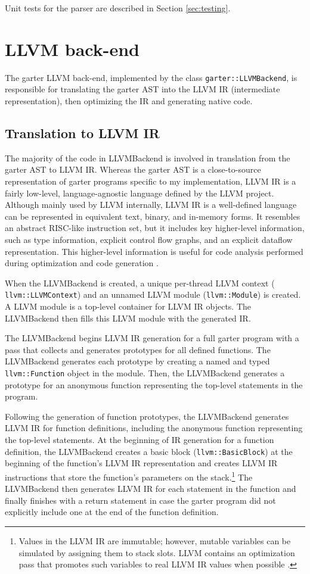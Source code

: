 \documentclass[11pt]{article}
\begin{document}
Unit tests for the parser are described in Section \ref{sec:testing}.

\section{LLVM back-end}

The garter LLVM back-end, implemented by the class {\tt garter::LLVMBackend}, is
responsible for translating the garter AST into the LLVM IR (intermediate
representation), then optimizing the IR and generating native code.

\subsection{Translation to LLVM IR}

The majority of the code in LLVMBackend is involved in translation from the
garter AST to LLVM IR.  Whereas the garter AST is a close-to-source
representation of garter programs specific to my implementation, LLVM IR is a
fairly low-level, language-agnostic language defined by the LLVM project.
Although mainly used by LLVM internally, LLVM IR is a well-defined language can
be represented in equivalent text, binary, and in-memory forms.  It resembles an
abstract RISC-like instruction set, but it includes key higher-level
information, such as type information, explicit control flow graphs, and an
explicit dataflow representation.  This higher-level information is useful for
code analysis performed during optimization and code generation
\cite{lattner2004llvm}.

When the LLVMBackend is created, a unique per-thread LLVM context ({\tt
llvm::LLVMContext}) and an unnamed LLVM module ({\tt llvm::Module}) is created.
A LLVM module is a top-level container for LLVM IR objects.  The LLVMBackend
then fills this LLVM module with the generated IR.

The LLVMBackend begins LLVM IR generation for a full garter program with a pass
that collects and generates prototypes for all defined functions.  The
LLVMBackend generates each prototype by creating a named and typed {\tt
llvm::Function} object in the module.  Then, the LLVMBackend generates a
prototype for an anonymous function representing the top-level statements in the
program.

Following the generation of function prototypes, the LLVMBackend generates LLVM
IR for function definitions, including the anonymous function representing the
top-level statements.  At the beginning of IR generation for a function
definition, the LLVMBackend creates a basic block ({\tt llvm::BasicBlock}) at
the beginning of the function's LLVM IR representation and creates LLVM IR
instructions that store the function's parameters on the stack.\footnote{Values
    in the LLVM IR are immutable; however, mutable variables can be simulated by
assigning them to stack slots.  LLVM contains an optimization pass that promotes
such variables to real LLVM IR values when possible \cite{kaleidoscope}.} The
LLVMBackend then generates LLVM IR for each statement in the function and
finally finishes with a return statement in case the garter program did not
explicitly include one at the end of the function definition.
\end{document}

